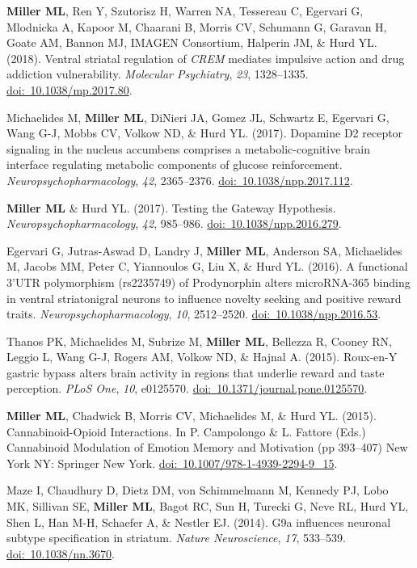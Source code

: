 \documentclass[10pt]{article}
\begin{document}
\begin{description}
\item \textbf{Miller ML}, Ren Y, Szutorisz H, Warren NA, Tessereau C, Egervari G, Mlodnicka A, Kapoor M, Chaarani B, Morris CV, Schumann G, Garavan H, Goate AM, Bannon MJ, IMAGEN Consortium, Halperin JM, \& Hurd YL. (2018). Ventral striatal regulation of \textit{CREM} mediates impulsive action and drug addiction vulnerability. \textit{Molecular Psychiatry}, \textit{23}, 1328--1335. \href{https://doi.org/10.1038/mp.2017.80}{doi:~10.1038/mp.2017.80}.
\item Michaelides M, \textbf{Miller ML}, DiNieri JA, Gomez JL, Schwartz E, Egervari G, Wang G-J, Mobbs CV, Volkow ND, \& Hurd YL. (2017). Dopamine D2 receptor signaling in the nucleus accumbens comprises a metabolic-cognitive brain interface regulating metabolic components of glucose reinforcement. \textit{Neuropsychopharmacology}, \textit{42}, 2365--2376. \href{https://doi.org/10.1038/npp.2017.112}{doi:~10.1038/npp.2017.112}.
\item \textbf{Miller ML} \& Hurd YL. (2017). Testing the Gateway Hypothesis. \textit{Neuropsychopharmacology}, \textit{42}, 985--986. \href{https://doi.org/10.1038/npp.2016.279}{doi:~10.1038/npp.2016.279}.
\item Egervari G, Jutras-Aswad D, Landry J, \textbf{Miller ML}, Anderson SA, Michaelides M, Jacobs MM, Peter C, Yiannoulos G, Liu X, \& Hurd YL. (2016). A functional 3’UTR polymorphism (rs2235749) of Prodynorphin alters microRNA-365 binding in ventral striatonigral neurons to influence novelty seeking and positive reward traits. \textit{Neuropsychopharmacology}, \textit{10}, 2512--2520. \href{https://doi.org/10.1038/npp.2016.53}{doi:~10.1038/npp.2016.53}.
\item Thanos PK, Michaelides M, Subrize M, \textbf{Miller ML}, Bellezza R, Cooney RN, Leggio L, Wang G-J, Rogers AM, Volkow ND, \& Hajnal A. (2015). Roux-en-Y gastric bypass alters brain activity in regions that underlie reward and taste perception. \textit{PLoS One}, \textit{10}, e0125570. \href{https://doi.org/10.1371/journal.pone.0125570}{doi:~10.1371/journal.pone.0125570}.
\item \textbf{Miller ML}, Chadwick B, Morris CV, Michaelides M, \& Hurd YL. (2015). Cannabinoid-Opioid Interactions. In P. Campolongo \& L. Fattore (Eds.) Cannabinoid Modulation of Emotion Memory and Motivation (pp 393--407) New York NY: Springer New York. \href{https://doi.org/10.1007/978-1-4939-2294-9_15}{doi:~10.1007/978-1-4939-2294-9\_15}.
\item Maze I, Chaudhury D, Dietz DM, von Schimmelmann M, Kennedy PJ, Lobo MK, Sillivan SE, \textbf{Miller ML}, Bagot RC, Sun H, Turecki G, Neve RL, Hurd YL, Shen L, Han M-H, Schaefer A, \& Nestler EJ. (2014). G9a influences neuronal subtype specification in striatum. \textit{Nature Neuroscience}, \textit{17}, 533--539. \href{https://doi.org/10.1038/nn.3670}{doi:~10.1038/nn.3670}.

\end{description}
\end{document}
